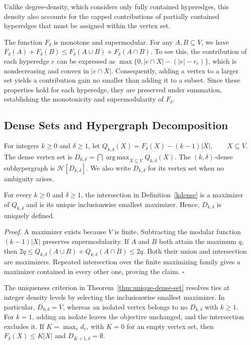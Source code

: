 \documentclass[twocolumn]{svjour3}
\begin{document}
Unlike degree-density, which considers only fully contained hyperedges, this density also accounts for the capped contributions of partially contained hyperedges that must be assigned within the vertex set.

The function $F_\delta$ is monotone and supermodular. For any $A,B\subseteq V$, we have
$F_\delta(A)+F_\delta(B)\le F_\delta(A\cup B)+F_\delta(A\cap B)$.
To see this, the contribution of each hyperedge $e$ can be expressed as $\max\{0,|e\cap X|-(|e|-r_e)\}$, which is nondecreasing and convex in $|e\cap X|$. Consequently, adding a vertex to a larger set yields a contribution gain no smaller than adding it to a subset. Since these properties hold for each hyperedge, they are preserved under summation, establishing the monotonicity and supermodularity of $F_\delta$.

\subsection{Dense Sets and Hypergraph Decomposition}
\begin{definition}\label{kdense}
For integers $k\ge0$ and $\delta\ge1$, let $Q_{k,\delta}(X)=F_\delta(X)-(k-1)|X|,
 \qquad X\subseteq V$.
The dense vertex set is
$D_{k,\delta}=\bigcap\operatorname*{arg\,max}_{X\subseteq V}Q_{k,\delta}(X)$.
The $(k,\delta)$-dense subhypergraph is $\mathcal H[D_{k,\delta}]$. We also write $D_{k,\delta}$ for its vertex set when no ambiguity arises.
\end{definition}

\begin{theorem}\label{thm:unique-dense-set}
For every $k\ge0$ and $\delta\ge1$, the intersection in Definition~\ref{kdense} is a maximizer of $Q_{k,\delta}$ and is its unique inclusionwise smallest maximizer. Hence, $D_{k,\delta}$ is uniquely defined.
\end{theorem}
\emph{Proof.} A maximizer exists because $V$ is finite. Subtracting the modular function $(k-1)|X|$ preserves supermodularity. If $A$ and $B$ both attain the maximum $q$, then
$2q\le Q_{k,\delta}(A\cup B)+Q_{k,\delta}(A\cap B)\le2q$.
Both their union and intersection are maximizers. Repeated intersection over the finite maximizing family gives a maximizer contained in every other one, proving the claim. \hfill$\square$

The uniqueness criterion in Theorem~\ref{thm:unique-dense-set} resolves ties at integer density levels by selecting the inclusionwise smallest maximizer. In particular, $D_{0,\delta}=V$, whereas an isolated vertex belongs to no $D_{k,\delta}$ with $k\ge1$. For $k=1$, adding an isolate leaves the objective unchanged, and the intersection excludes it. If $K=\max_v d_v$, with $K=0$ for an empty vertex set, then $F_\delta(X)\le K|X|$ and $D_{K+1,\delta}=\emptyset$.
\end{document}
